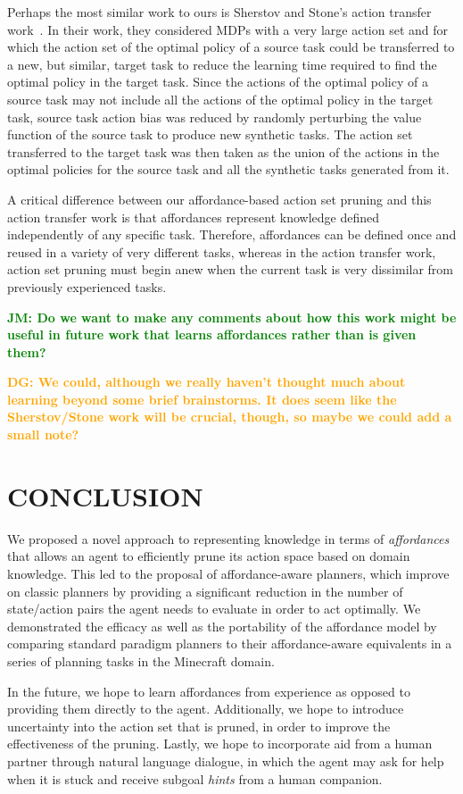 \documentclass[]{article}
\newcommand{\jmnote}[1]{\textcolor{Green}{\textbf{JM: #1}}}
\newcommand{\dgnote}[1]{\textcolor{Orange}{\textbf{DG: #1}}}
\begin{document}
Perhaps the most similar work to ours is Sherstov and Stone's action transfer work~\cite{sherstov2005improving}.
In their work, they considered MDPs with a very large action set and for which the action
set of the optimal policy of a source task could be transferred to a new, but similar, target
task to reduce the learning time required to find the optimal policy in the target task. Since the actions
of the optimal policy of a source task may not include all the actions of the optimal policy
in the target task, source task action bias was reduced by randomly perturbing the value function
of the source task to produce new synthetic tasks. The action set transferred to the target task
was then taken as the union of the actions in the optimal policies for the source task and all the
synthetic tasks generated from it.

A critical difference between our affordance-based action set pruning and this action transfer
work is that affordances represent knowledge defined independently of any specific task. Therefore,
affordances can be defined once and reused in a variety of very different tasks, whereas in the action transfer work, action set pruning
must begin anew when the current task is very dissimilar from previously experienced tasks.

\jmnote{Do we want to make any comments about how this work might be useful in future work that learns
affordances rather than is given them?}

\dgnote{We could, although we really haven't thought much about learning beyond some brief brainstorms. It does seem like the Sherstov/Stone work will be crucial, though, so maybe we could add a small note?}



\section{CONCLUSION}

We proposed a novel approach to representing knowledge in terms of
{\em affordances}~\citep{gibson77} that allows an agent to efficiently
prune its action space based on domain knowledge. This led to the 
proposal of affordance-aware planners, which improve on classic planners
by providing a significant reduction in the number of state/action pairs the
agent needs to evaluate in order to act optimally. We demonstrated the efficacy 
as well as the portability of the affordance model by comparing standard paradigm
planners to their affordance-aware equivalents in a series of planning tasks in the Minecraft
domain.

In the future, we hope to learn affordances from experience as opposed
to providing them directly to the agent. Additionally, we hope to
introduce uncertainty into the action set that is pruned, in order to
improve the effectiveness of the pruning. Lastly, we hope to
incorporate aid from a human partner through natural language
dialogue, in which the agent may ask for help when it is stuck and
receive subgoal {\it hints} from a human companion.


  
\end{document}
